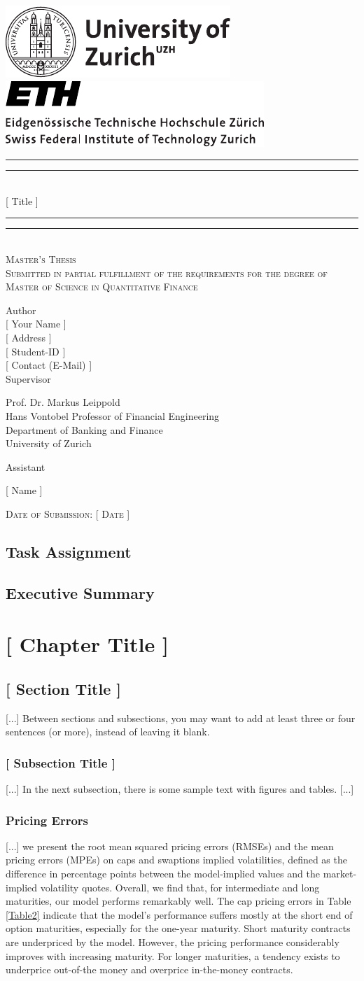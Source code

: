 \documentclass[11pt,a4paper,english,oneside]{book}
\newcommand*{\plogo}{\includegraphics{uzh_logo_e_pos}}
\newcommand*{\plog}{\includegraphics{ETHlogo}}
\numberwithin{equation}{chapter}
\newcommand*{\titleGP}{\begingroup %
\centering %
\vspace*{\baselineskip} %
\plogo\hspace{120pt}\plog\\[2\baselineskip] %
\rule{\textwidth}{1.6pt}\vspace*{-\baselineskip}\vspace*{2pt} %
\rule{\textwidth}{0.4pt}\\[\baselineskip] %
{\LARGE [ Title ]}\\[0.2\baselineskip] %
\rule{\textwidth}{0.4pt}\vspace*{-\baselineskip}\vspace{3.2pt} %
\rule{\textwidth}{1.6pt}\\[2\baselineskip] %
\scshape %
Master's Thesis\\[2\baselineskip]
Submitted in partial fulfillment of the requirements for the degree of Master of Science in Quantitative Finance \par
\vspace*{2\baselineskip}
Author\\
{\Large [ Your Name ] \\ [5pt]
 }
[ Address ] \\[5pt]
[ Student-ID ]\\[5pt]
[ Contact (E-Mail) ] \\


\vspace*{2\baselineskip}
Supervisor\\
{\Large Prof. Dr. Markus Leippold\\[5pt]\small Hans Vontobel Professor of Financial Engineering\\[5pt]
\small Department of Banking and Finance\\[5pt]University of Zurich\par}
\vspace*{2\baselineskip}
Assistant\\
{\Large [ Name ] \par}
\vfill
{\scshape Date of Submission: [ Date ]} \\[0.3\baselineskip]
\endgroup}
\begin{document}
\thispagestyle{empty}
\titleGP
\newpage
\doublespacing
\setcounter{page}{1}
\section*{Task Assignment}
\thispagestyle{firststyle}
\newpage
\section*{Executive Summary}
\thispagestyle{firststyle}
\tableofcontents
\listoffigures
\listoftables
\newpage
{}
\chapter{[ Chapter Title ]}

\section{[ Section Title ]}

[...] Between sections and subsections, you may want to add at least three or four sentences (or more), instead of leaving it blank.

\subsection{[ Subsection Title ]}

[...] In the next subsection, there is some sample text with figures and tables. [...]




\subsection{Pricing Errors}


[...] we present the root mean squared pricing errors (RMSEs) and the mean pricing errors (MPEs) on caps and swaptions implied volatilities, defined as the difference in percentage points between the model-implied values and the market-implied volatility quotes. Overall, we find that, for intermediate and long maturities, our model performs remarkably well. The cap pricing errors in Table \ref{Table2} indicate that the model's performance suffers mostly at the short end of option maturities, especially for the one-year maturity. Short maturity contracts are underpriced by the model. However, the pricing performance considerably improves with increasing maturity. For longer maturities, a tendency exists to underprice out-of-the money and overprice in-the-money contracts.
\end{document}
